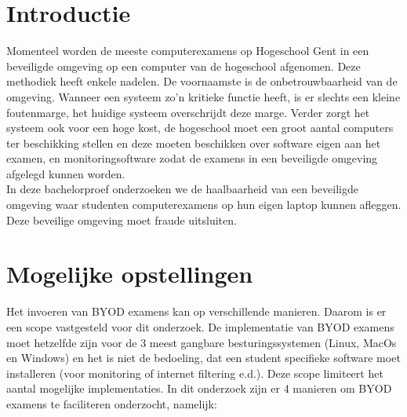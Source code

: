 \documentclass[a0,portrait]{a0poster}
\begin{document}
\begin{multicols}{2}
\color{HoGentAccent1} 
 \section*{Introductie}
 \color{black}
 \color{black}
 
 Momenteel worden de meeste computerexamens op Hogeschool Gent in een beveiligde omgeving op een computer van de hogeschool afgenomen. Deze methodiek heeft enkele nadelen. De voornaamste is de onbetrouwbaarheid van de omgeving. Wanneer een systeem zo'n kritieke functie heeft, is er slechts een kleine foutenmarge, het huidige systeem overschrijdt deze marge.  Verder zorgt het systeem ook voor een hoge kost, de hogeschool moet een groot aantal computers ter beschikking stellen en deze moeten beschikken over software eigen aan het examen, en monitoringsoftware zodat de examens in een beveiligde omgeving afgelegd kunnen worden. \\ In deze bachelorproef onderzoeken we de haalbaarheid van een beveiligde omgeving waar studenten computerexamens op hun eigen laptop kunnen afleggen. Deze beveilige omgeving moet fraude uitsluiten. \\
 
 




\color{Black} %
\color{HoGentAccent1} 
\section*{Mogelijke opstellingen}
\color{black}

Het invoeren van BYOD examens kan op verschillende manieren. Daarom is er een scope vastgesteld voor dit onderzoek. De implementatie van BYOD examens moet hetzelfde zijn voor de 3 meest gangbare besturingssystemen (Linux, MacOs en Windows) en het is niet de bedoeling, dat een student specifieke software moet installeren (voor monitoring of internet filtering e.d.). Deze scope limiteert het aantal mogelijke implementaties. In dit onderzoek zijn er 4 manieren om BYOD examens te faciliteren onderzocht, namelijk: \\


\end{multicols}
\end{document}
